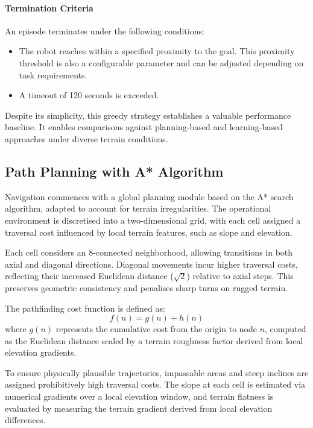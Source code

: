 \documentclass[conference]{IEEEtran}
\begin{document}
\paragraph{Termination Criteria}

An episode terminates under the following conditions:

\begin{itemize}
    \item The robot reaches within a specified proximity to the goal. This proximity threshold is also a configurable parameter and can be adjusted depending on task requirements.
    \item A timeout of 120 seconds is exceeded.
\end{itemize}

Despite its simplicity, this greedy strategy establishes a valuable performance baseline. It enables comparisons against planning-based and learning-based approaches under diverse terrain conditions.

\subsection{Path Planning with A* Algorithm}

Navigation commences with a global planning module based on the A* search algorithm, adapted to account for terrain irregularities. The operational environment is discretised into a two-dimensional grid, with each cell assigned a traversal cost influenced by local terrain features, such as slope and elevation.

Each cell considers an 8-connected neighborhood, allowing transitions in both axial and diagonal directions. Diagonal movements incur higher traversal costs, reflecting their increased Euclidean distance ($\sqrt{2}$) relative to axial steps. This preserves geometric consistency and penalises sharp turns on rugged terrain.

The pathfinding cost function is defined as:
\[
f(n) = g(n) + h(n)
\]
where $g(n)$ represents the cumulative cost from the origin to node $n$, computed as the Euclidean distance scaled by a terrain roughness factor derived from local elevation gradients. 

To ensure physically plausible trajectories, impassable areas and steep inclines are assigned prohibitively high traversal costs. The slope at each cell is estimated via numerical gradients over a local elevation window, and terrain flatness is evaluated by measuring the terrain gradient derived from local elevation differences.
\end{document}
